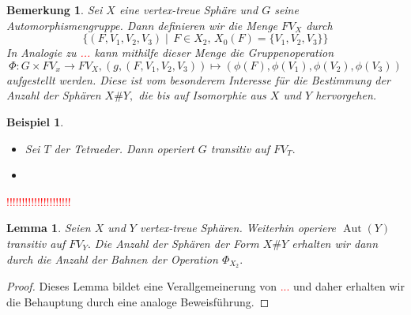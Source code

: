 \documentclass[12pt,titlepage,twoside,cleardoublepage]{article}
\theoremstyle{nummermitklammern}
\newtheorem{lemma}[temp]{Lemma}
\newtheorem{bsp}[temp]{Beispiel}
\newtheorem{bemerkung}[temp]{Bemerkung}
\newtheorem{lemma}[zahl]{Lemma}
\newtheorem{bsp}[zahl]{Beispiel}
\newtheorem{bemerkung}[zahl]{Bemerkung}
\numberwithin{equation}{section}
\DeclareMathOperator{\Aut}{Aut}
\begin{document}
  
\begin{bemerkung}
Sei $X$ eine vertex-treue Sphäre und $G$ seine Automorphismengruppe. Dann definieren wir die Menge $FV_X$ durch   
\[
\{(F,V_1,V_2,V_3)\mid \, F\in X_2,\, X_0(F)=\{V_1,V_2,V_3\}\}
\]
In Analogie zu \textcolor{red}{...} kann mithilfe dieser Menge die Gruppenoperation
\[
\Phi:G\times FV_x\to FV_X,(g,(F,V_1,V_2,V_3))\mapsto (\phi(F),\phi(V_1),\phi(V_2),\phi(V_3))
\] 
aufgestellt werden. Diese ist vom besonderem Interesse für die Bestimmung der Anzahl der Sphären $X\#Y,$ die bis auf Isomorphie aus $X$ und $Y$ hervorgehen.
\end{bemerkung}
\begin{bsp}
\begin{itemize}
\item 
Sei $T$ der Tetraeder. Dann operiert $G$ transitiv auf $FV_T.$
\item

\end{itemize}
\end{bsp}
\textcolor{red}{!!!!!!!!!!!!!!!!!!!!!}
\begin{lemma}
Seien $X$ und $Y$ vertex-treue Sphären. Weiterhin operiere $
\Aut(Y)$ transitiv auf $FV_Y.$ Die Anzahl der Sphären der Form $X\#Y$ erhalten wir dann durch die Anzahl der Bahnen der Operation $ \Phi_{X_2}.$ 
\end{lemma}
\begin{proof}
Dieses Lemma bildet eine Verallgemeinerung von \textcolor{red}{...} und daher erhalten wir die Behauptung durch eine analoge Beweisführung.
\end{proof}
\pagestyle{empty}
\end{document}
